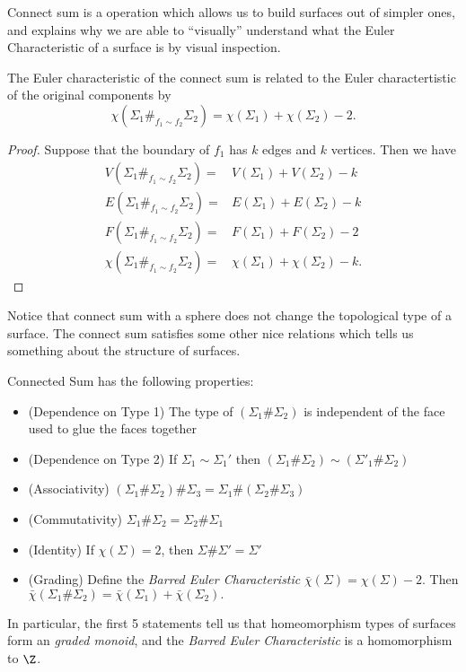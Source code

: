 Connect sum is a operation which allows us to build surfaces out of simpler ones, and explains why we are able to ``visually'' understand what the Euler Characteristic of a surface is by visual inspection.
\begin{claim}
The Euler characteristic of the connect sum is related to the Euler charactertistic of the original components by 
\[\chi(\Sigma_1\#_{f_1\sim f_2} \Sigma_2)=\chi(\Sigma_1)+\chi(\Sigma_2)-2.\]
\end{claim}
\begin{proof}
Suppose that the boundary of $f_1$ has $k$ edges and $k$ vertices. Then we have 
\begin{align*}
V(\Sigma_1\#_{f_1\sim f_2} \Sigma_2)=&V(\Sigma_1)+V(\Sigma_2)-k\\
E(\Sigma_1\#_{f_1\sim f_2} \Sigma_2)=&E(\Sigma_1)+E(\Sigma_2)-k\\
F(\Sigma_1\#_{f_1\sim f_2} \Sigma_2)=&F(\Sigma_1)+F(\Sigma_2)-2\\
\chi(\Sigma_1\#_{f_1\sim f_2} \Sigma_2)=&\chi(\Sigma_1)+\chi(\Sigma_2)-k.
\end{align*}
\end{proof}
Notice that connect sum with a sphere does not change the topological type of a surface. The connect sum satisfies some other nice relations which tells us something about the structure of surfaces. 
\begin{claim}
 Connected Sum has the following properties:
 \begin{itemize}
  \item (Dependence on Type 1) The type of $(\Sigma_1\#\Sigma_2)$ is independent of the face used to glue the faces together
  \item (Dependence on Type 2) If $\Sigma_1\sim \Sigma_1'$ then $(\Sigma_1\#\Sigma_2)\sim (\Sigma'_1\#\Sigma_2)$
  \item (Associativity) $(\Sigma_1\#\Sigma_2)\#\Sigma_3=\Sigma_1\#(\Sigma_2\#\Sigma_3)$
  \item (Commutativity) $\Sigma_1\# \Sigma_2=\Sigma_2\#\Sigma_1$
  \item (Identity) If $\chi(\Sigma)=2$, then $\Sigma\#\Sigma'=\Sigma'$
  \item (Grading) Define the \emph{Barred Euler Characteristic} $\bar\chi(\Sigma)=\chi(\Sigma)-2$. Then $ \bar\chi(\Sigma_1\# \Sigma_2)= \bar\chi(\Sigma_1)+\bar\chi(\Sigma_2). $ \footnotemark
 \end{itemize}
 In particular, the first 5 statements tell us that homeomorphism types of surfaces form an \emph{graded monoid}, and the \emph{Barred Euler Characteristic} is a homomorphism to $\Z$.    
\end{claim}
